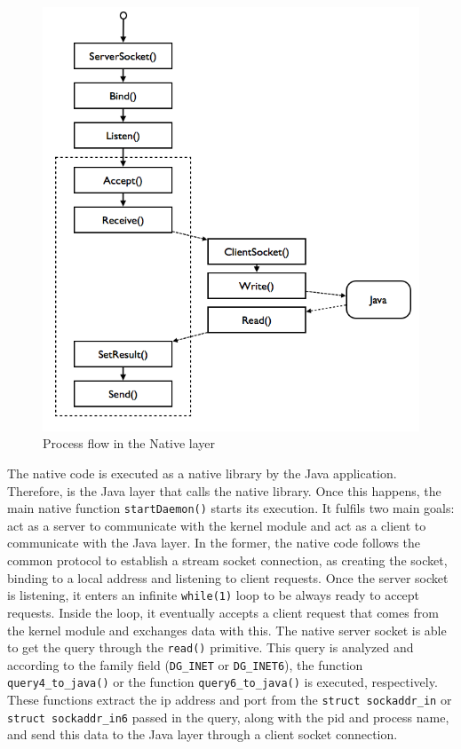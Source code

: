 \begin{figure}[h]
 \centering
 \includegraphics[scale=0.5]{figures/dg_native_flow.png}
 \caption{Process flow in the Native layer}
 \label{fig:dg_native_flow}
\end{figure}

The native code is executed as a native library by the Java application. Therefore, is the Java layer that calls the native library. Once this happens, the main native function \texttt{startDaemon()} starts its execution. It fulfils two main goals: act as a server to communicate with the kernel module and act as a client to communicate with the Java layer. In the former, the native code follows the common protocol to establish a stream socket connection, as creating the socket, binding to a local address and listening to client requests. Once the server socket is listening, it enters an infinite \texttt{while(1)} loop to be always ready to accept requests. Inside the loop, it eventually accepts a client request that comes from the kernel module and exchanges data with this. The native server socket is able to get the query through the \texttt{read()} primitive. This query is analyzed and according to the family field (\texttt{DG\_INET} or \texttt{DG\_INET6}), the function \texttt{query4\_to\_java()} or the function \texttt{query6\_to\_java()} is executed, respectively. These functions extract the \gls{ip} address and port from the \texttt{struct sockaddr\_in} or \texttt{struct sockaddr\_in6} passed in the query, along with the pid and process name, and send this data to the Java layer through a client socket connection. 

